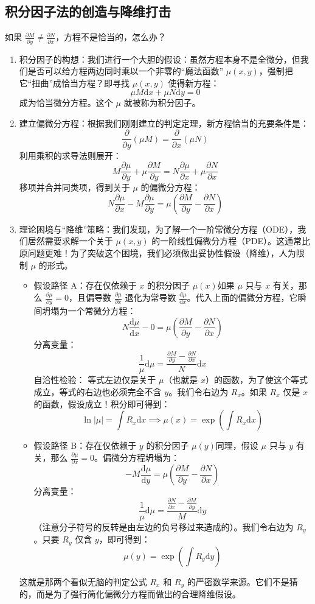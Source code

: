 \documentclass[lang=cn,11pt]{elegantbook}
\begin{document}
\subsection{积分因子法的创造与降维打击}

如果 $\frac{\partial M}{\partial y} \neq \frac{\partial N}{\partial x}$，方程不是恰当的，怎么办？
\begin{enumerate}
    \item 积分因子的构想：我们进行一个大胆的假设：虽然方程本身不是全微分，但我们是否可以给方程两边同时乘以一个非零的“魔法函数” $\mu(x,y)$，强制把它“扭曲”成恰当方程？即寻找 $\mu(x,y)$ 使得新方程：$$\mu M\mathrm{d}x + \mu N\mathrm{d}y = 0$$成为恰当微分方程。这个 $\mu$ 就被称为积分因子。
    \item 建立偏微分方程：根据我们刚刚建立的判定定理，新方程恰当的充要条件是：$$\frac{\partial}{\partial y}(\mu M) = \frac{\partial}{\partial x}(\mu N)$$利用乘积的求导法则展开：$$M\frac{\partial \mu}{\partial y} + \mu\frac{\partial M}{\partial y} = N\frac{\partial \mu}{\partial x} + \mu\frac{\partial N}{\partial x}$$移项并合并同类项，得到关于 $\mu$ 的偏微分方程：$$N\frac{\partial \mu}{\partial x} - M\frac{\partial \mu}{\partial y} = \mu\left(\frac{\partial M}{\partial y} - \frac{\partial N}{\partial x}\right)$$
    \item 理论困境与“降维”策略：我们发现，为了解一个一阶常微分方程（ODE），我们居然需要求解一个关于 $\mu(x,y)$ 的一阶线性偏微分方程（PDE）。这通常比原问题更难！为了突破这个困境，我们必须做出妥协性假设（降维），人为限制 $\mu$ 的形式。
    \begin{itemize}
    \item 假设路径 A：存在仅依赖于 $x$ 的积分因子 $\mu(x)$如果 $\mu$ 只与 $x$ 有关，那么 $\frac{\partial \mu}{\partial y} = 0$，且偏导数 $\frac{\partial \mu}{\partial x}$ 退化为常导数 $\frac{\mathrm{d}\mu}{\mathrm{d}x}$。代入上面的偏微分方程，它瞬间坍塌为一个常微分方程：$$N\frac{\mathrm{d}\mu}{\mathrm{d}x} - 0 = \mu\left(\frac{\partial M}{\partial y} - \frac{\partial N}{\partial x}\right)$$分离变量：$$\frac{1}{\mu}\mathrm{d}\mu = \frac{\frac{\partial M}{\partial y} - \frac{\partial N}{\partial x}}{N}\mathrm{d}x$$自洽性检验： 等式左边仅是关于 $\mu$（也就是 $x$）的函数，为了使这个等式成立，等式的右边也必须完全不含 $y$。我们令右边为 $R_x$。如果 $R_x$ 仅是 $x$ 的函数，假设成立！积分即可得到：$$\ln|\mu| = \int R_x \mathrm{d}x \implies \mu(x) = \exp\!\left(\int R_x \mathrm{d}x\right)$$
    \item 假设路径 B：存在仅依赖于 $y$ 的积分因子 $\mu(y)$同理，假设 $\mu$ 只与 $y$ 有关，那么 $\frac{\partial \mu}{\partial x} = 0$。偏微分方程坍塌为：$$-M\frac{\mathrm{d}\mu}{\mathrm{d}y} = \mu\left(\frac{\partial M}{\partial y} - \frac{\partial N}{\partial x}\right)$$分离变量：$$\frac{1}{\mu}\mathrm{d}\mu = \frac{\frac{\partial N}{\partial x} - \frac{\partial M}{\partial y}}{M}\mathrm{d}y$$（注意分子符号的反转是由左边的负号移过来造成的）。我们令右边为 $R_y$。只要 $R_y$ 仅含 $y$，即可得到：$$\mu(y) = \exp\!\left(\int R_y \mathrm{d}y\right)$$
    \end{itemize}
    这就是那两个看似无脑的判定公式 $R_x$ 和 $R_y$ 的严密数学来源。它们不是猜的，而是为了强行简化偏微分方程而做出的合理降维假设。
\end{enumerate}
\end{document}
